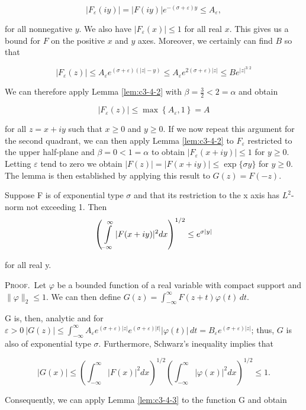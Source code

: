 \[
|F_{\varepsilon}(i y)|=|F(i y)|e^{-(\sigma+\varepsilon)y}\leq A_{\varepsilon},
\]

for all nonnegative $y$. We also have $|F_\varepsilon(x)| \leq 1$ for all real $x$. This gives us a bound for $F$ on the positive $x$ and $y$ axes. Moreover, we certainly can find $B$ so that

\[
\big|F_{\varepsilon}(z)\big|\leq A_{\varepsilon}e^{(\sigma+\varepsilon)(|z|-y)}\leq A_{\varepsilon}e^{2(\sigma+\varepsilon)|z|}\leq B e^{|z|^{3:2}}
\]

We can therefore apply Lemma \ref{lem:c3-4-2} with $\beta = \frac{3}{2} < 2 = \alpha$ and obtain

\[
\left|F_{\varepsilon}(z)\right|\leq\max\left\{A_{\varepsilon},1\right\}=A
\]

for all $z = x + iy$ such that $x \geq 0$ and $y \geq 0$. If we now repeat this argument for the second quadrant, we can then apply Lemma \ref{lem:c3-4-2} to $F_\varepsilon$ restricted to the upper half-plane and $\beta = 0 < 1 = \alpha$ to obtain $|F_\varepsilon(x + iy)| \leq 1$ for $y \geq 0$. Letting $\varepsilon$ tend to zero we obtain $|F(z)| = |F(x + iy)| \leq \exp\{\sigma y\}$ for $y \geq 0$. The lemma is then established by applying this result to $G(z) = F(-z)$.

\begin{lemma}
\label{lem:c3-4-4}
Suppose F is of exponential type $\sigma$ and that its restriction to the x axis has $L^{2}$-norm not exceeding 1. Then
\[
\left(\intop_{-\infty}^{\infty}|F(x+i y)|^{2}d x\right)^{1/2}\leq e^{\sigma|y|}
\]

for all real y.
\end{lemma}

\textsc{Proof.}\ Let $\varphi$ be a bounded function of a real variable with compact support and $\|\varphi\|_2 \leq 1$. We can then define $G(z) = \int_{-\infty}^{\infty} F(z + t)\varphi(t) \, dt$.

G is, then, analytic and for $\varepsilon > 0\ |G(z)|\leq\int_{-\infty}^{\infty}A_{\varepsilon}e^{(\sigma+\varepsilon)|z|}e^{(\sigma+\varepsilon)|t|}|\varphi(t)|\,dt=B_{\varepsilon}e^{(\sigma+\varepsilon)|z|}$; thus, $G$ is also of exponential type $\sigma$. Furthermore, Schwarz's inequality implies that

\[
|G(x)|\leq\left(\int_{-\infty}^{\infty}|F(x)|^{2}d x\right)^{1/2}\left(\int_{-\infty}^{\infty}|\varphi(x)|^{2}d x\right)^{1/2}\leq1.
\]

Consequently, we can apply Lemma \ref{lem:c3-4-3} to the function G and obtain

